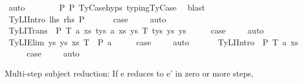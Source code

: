 \begin{isabellebody}
\ auto\isanewline
\ \ \ \ \ \ \isamarkupfalse%
\ P{}\ P{}\ TyCase{\isachardot}{\kern0pt}hyps{\isacharparenleft}{\kern0pt}{}{\isacharparenright}{\kern0pt}\ typing{\isachardot}{\kern0pt}TyCase\ \isamarkupfalse%
\ blast\isanewline
\ \ \isamarkupfalse%
\isanewline
{}\isamarkupfalse%
\isanewline
\ \ \isamarkupfalse%
\ {\isacharparenleft}{\kern0pt}TyLIIntro\ lhs\ rhs\ P\ {\isasymGamma}{\isacharparenright}{\kern0pt}\isanewline
\ \ \isamarkupfalse%
\ \isamarkupfalse%
\ {\isacharquery}{\kern0pt}case\ \isanewline
\ \ \isamarkupfalse%
\ auto\isanewline
\ \ \isamarkupfalse%
\isanewline
{}\isamarkupfalse%
\isanewline
\ \ \isamarkupfalse%
\ {\isacharparenleft}{\kern0pt}TyLITrans\ {\isasymGamma}\ P\ T{}\ a{}\ xs{}\ tys{}\ a{}\ xs{}\ ys{}\ T{}\ tys{}\ ys{}\ ys{\isacharparenright}{\kern0pt}\isanewline
\ \ \isamarkupfalse%
\ \isamarkupfalse%
\ {\isacharquery}{\kern0pt}case\ \isanewline
\ \ \isamarkupfalse%
\ auto\isanewline
\ \ \isamarkupfalse%
\isanewline
{}\isamarkupfalse%
\isanewline
\ \ \isamarkupfalse%
\ {\isacharparenleft}{\kern0pt}TyLIElim{}\ ys\ ys{\isacharprime}{\kern0pt}\ xs\ T\ {\isasymGamma}\ P\ a{\isacharparenright}{\kern0pt}\isanewline
\ \ \isamarkupfalse%
\ \isamarkupfalse%
\ {\isacharquery}{\kern0pt}case\ \isanewline
\ \ \isamarkupfalse%
\ auto\isanewline
\ \ \isamarkupfalse%
\isanewline
{}\isamarkupfalse%
\isanewline
\ \ \isamarkupfalse%
\ {\isacharparenleft}{\kern0pt}TyLIIntro{}\ {\isasymGamma}\ P\ T\ a\ xs{\isacharparenright}{\kern0pt}\isanewline
\ \ \isamarkupfalse%
\ \isamarkupfalse%
\ {\isacharquery}{\kern0pt}case\ \isanewline
\ \ \isamarkupfalse%
\ auto\isanewline
\ \ \isamarkupfalse%
\isanewline
{}\isamarkupfalse%
%
\endisatagproof
{\isafoldproof}%
%
\isadelimproof
%
\endisadelimproof
%
\begin{isamarkuptext}%
Multi-step subject reduction:
  If e reduces to e' in zero or more steps,

\end{isamarkuptext}
\end{isabellebody}
